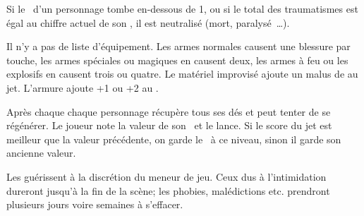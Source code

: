 {		Si le \HD\ d'un personnage tombe en-dessous de 1, ou si le total des traumatismes est égal au chiffre actuel de son \HD, il est neutralisé (mort, paralysé~\ldots).


		\noindent
		Il n'y a pas de liste d'équipement. Les armes normales causent une blessure par touche, les armes spéciales ou magiques en causent deux, les armes à feu ou les explosifs en causent trois ou quatre. Le matériel improvisé ajoute un malus de  au jet. L'armure ajoute +1 ou +2 au \RD.


		\noindent
		Après chaque  chaque personnage récupère tous ses dés et peut tenter de se régénérer. Le joueur note la valeur de son \HD\ et le lance. Si le score du jet est meilleur que la valeur précédente, on garde le \HD\ à ce niveau, sinon il garde son ancienne valeur.

		Les  guérissent à la discrétion du meneur de jeu. Ceux dus à l'intimidation dureront jusqu'à la fin de la scène; les phobies, malédictions etc. prendront plusieurs jours voire semaines à s'effacer.
}

